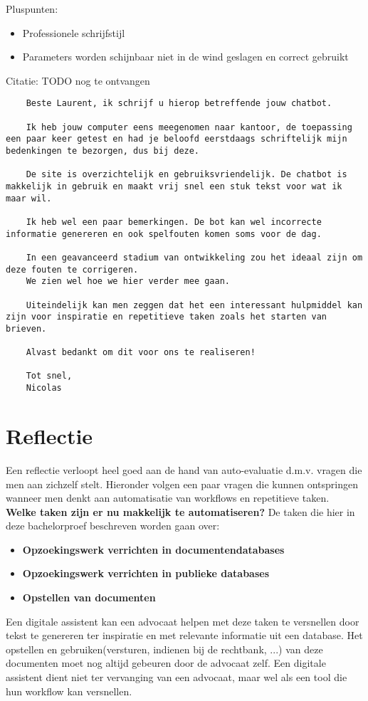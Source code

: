 Pluspunten:
\begin{itemize}
	\item Professionele schrijfstijl
	\item Parameters worden schijnbaar niet in de wind geslagen en correct gebruikt
\end{itemize}


Citatie: TODO nog te ontvangen

\begin{lstlisting}
	Beste Laurent, ik schrijf u hierop betreffende jouw chatbot. 

	Ik heb jouw computer eens meegenomen naar kantoor, de toepassing een paar keer getest en had je beloofd eerstdaags schriftelijk mijn bedenkingen te bezorgen, dus bij deze. 
	
	De site is overzichtelijk en gebruiksvriendelijk. De chatbot is makkelijk in gebruik en maakt vrij snel een stuk tekst voor wat ik maar wil. 	

	Ik heb wel een paar bemerkingen. De bot kan wel incorrecte informatie genereren en ook spelfouten komen soms voor de dag. 

	In een geavanceerd stadium van ontwikkeling zou het ideaal zijn om deze fouten te corrigeren. 
	We zien wel hoe we hier verder mee gaan. 

	Uiteindelijk kan men zeggen dat het een interessant hulpmiddel kan zijn voor inspiratie en repetitieve taken zoals het starten van brieven. 

	Alvast bedankt om dit voor ons te realiseren!

	Tot snel, 
	Nicolas
\end{lstlisting}


\section{Reflectie}
Een reflectie verloopt heel goed aan de hand van auto-evaluatie d.m.v. vragen die men aan zichzelf stelt.
Hieronder volgen een paar vragen die kunnen ontspringen wanneer men denkt aan automatisatie van workflows en repetitieve taken.\\

\textbf{Welke taken zijn er nu makkelijk te automatiseren?}
De taken die hier in deze bachelorproef beschreven worden gaan over:
\begin{itemize}
	\item \textbf{Opzoekingswerk verrichten in documentendatabases}
	\item \textbf{Opzoekingswerk verrichten in publieke databases}
	\item \textbf{Opstellen van documenten}
\end{itemize}
Een digitale assistent kan een advocaat helpen met deze taken te versnellen door tekst te genereren ter inspiratie en met relevante informatie uit een database.
Het opstellen en gebruiken(versturen, indienen bij de rechtbank, ...) van deze documenten moet nog altijd gebeuren door de advocaat zelf.
Een digitale assistent dient niet ter vervanging van een advocaat, maar wel als een tool die hun workflow kan versnellen. \\

